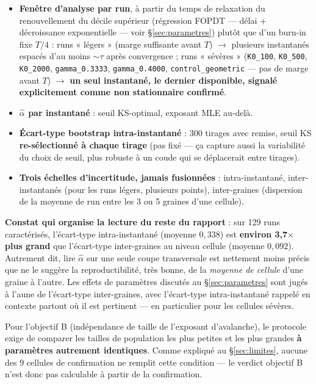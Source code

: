 \documentclass[11pt,a4paper]{article}
\newcommand{\code}[1]{\texttt{#1}}
\begin{document}
\begin{itemize}
\item \textbf{Fenêtre d'analyse par run}, à partir du temps de
  relaxation du renouvellement du décile supérieur (régression FOPDT
  --- délai + décroissance exponentielle --- voir \S\ref{sec:parametres})
  plutôt que d'un burn-in fixe $T/4$ : runs « légers » (marge
  suffisante avant $T$) $\to$ plusieurs instantanés espacés d'au moins
  $\sim\tau$ après convergence ; runs « sévères »
  (\code{K0\_100}, \code{K0\_500}, \code{K0\_2000},
  \code{gamma\_0.3333}, \code{gamma\_0.4000}, \code{control\_geometric}
  --- pas de marge avant $T$) $\to$ \textbf{un seul instantané, le
  dernier disponible, signalé explicitement comme non stationnaire
  confirmé}.
\item \textbf{$\hat\alpha$ par instantané} : seuil KS-optimal, exposant
  MLE au-delà.
\item \textbf{Écart-type bootstrap intra-instantané} : 300 tirages avec
  remise, seuil KS \textbf{re-sélectionné à chaque tirage} (pas fixé ---
  ça capture aussi la variabilité du choix de seuil, plus robuste à un
  coude qui se déplacerait entre tirages).
\item \textbf{Trois échelles d'incertitude, jamais fusionnées} :
  intra-instantané, inter-instantanés (pour les runs légers, plusieurs
  points), inter-graines (dispersion de la moyenne de run entre les 3
  ou 5 graines d'une cellule).
\end{itemize}

\textbf{Constat qui organise la lecture du reste du rapport} : sur 129
runs caractérisés, l'écart-type intra-instantané (moyenne $0{,}338$) est
\textbf{environ 3,7$\times$ plus grand} que l'écart-type inter-graines
au niveau cellule (moyenne $0{,}092$). Autrement dit, lire $\hat\alpha$
sur une seule coupe transversale est nettement moins précis que ne le
suggère la reproductibilité, très bonne, de la \emph{moyenne de
cellule} d'une graine à l'autre. Les effets de paramètres discutés au
\S\ref{sec:parametres} sont jugés à l'aune de l'écart-type
inter-graines, avec l'écart-type intra-instantané rappelé en contexte
partout où il est pertinent --- en particulier pour les cellules
sévères.

Pour l'objectif B (indépendance de taille de l'exposant d'avalanche), le
protocole exige de comparer les tailles de population les plus petites
et les plus grandes \textbf{à paramètres autrement identiques}. Comme
expliqué au \S\ref{sec:limites}, aucune des 9 cellules de confirmation
ne remplit cette condition --- le verdict objectif B n'est donc pas
calculable à partir de la confirmation.
\end{document}
